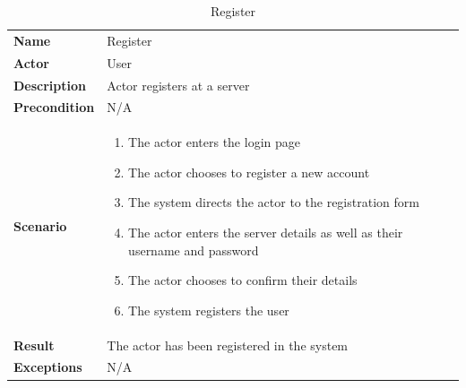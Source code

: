\begin{table}[ht]
    \centering
    \caption{Register}
    \begin{tabular}{|L{5cm}|L{10cm}|}
        \toprule
        \textbf{Name}         & Register                                    \\
        \textbf{Actor}        & User                                        \\
        \textbf{Description}  & Actor registers at a server                 \\
        \textbf{Precondition} & N/A                                         \\
        \textbf{Scenario} &
        \vspace{-0.75cm}
        \begin{enumerate}
            \setlength\itemsep{-0.5em}
            \item The actor enters the login page
            \item The actor chooses to register a new account
            \item The system directs the actor to the registration form
            \item The actor enters the server details as well as their username and password
            \item The actor chooses to confirm their details
            \item The system registers the user
        \end{enumerate} \\[-0.5cm]
        \textbf{Result}       & The actor has been registered in the system \\
        \textbf{Exceptions}   & N/A                                         \\
        \bottomrule
    \end{tabular}
    \label{tab:table7}
\end{table}

